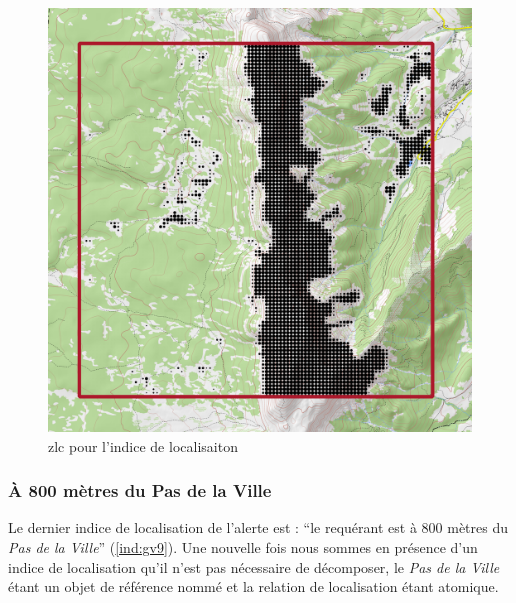 \begin{figure}
  \centering
  \includegraphics{./figures/NotForet_GrandVeymont.png}
  \caption{\ac{zlc} pour l'indice de localisaiton }
  \label{fig:ZLC_GrandVeymont_X}
\end{figure}




\subsubsection{À 800 mètres du Pas de la Ville}

Le dernier indice de localisation de l'alerte est : \enquote{le
  requérant est à 800 mètres du \emph{Pas de la Ville}}
(\ref{ind:gv9}). Une nouvelle fois nous sommes en présence d'un indice
de localisation qu'il n'est pas nécessaire de décomposer, le \emph{Pas
  de la Ville} étant un objet de référence nommé et la relation de
localisation  étant
atomique.

